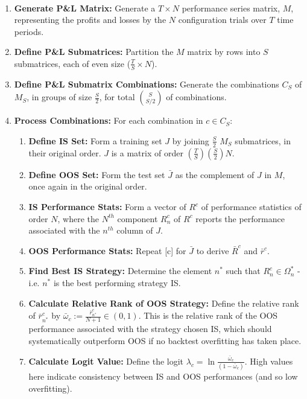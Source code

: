 \documentclass[a4paper,11pt,oneside]{article}
\theoremstyle{plain}
\theoremstyle{definition}
\begin{document}
	\begin{algorithm}[H]
		\texttt{\\}
		
		\begin{enumerate}
			\item \textbf{Generate P\&L Matrix:} Generate a $T\times N$ performance series matrix, $M$, representing the profits and losses by the $N$ configuration trials over $T$ time periods.
			\item \textbf{Define P\&L Submatrices:}  Partition the $M$ matrix by rows into $S$ submatrices, each of even size ($\frac{T}{S}\times N$).
			\item \textbf{Define P\&L Submatrix Combinations:} Generate the combinations $C_S$ of $M_S$, in groups of size $\frac{S}{2}$, for total $\binom{S}{S/2}$ of combinations.
			\item \textbf{Process Combinations:} For each combination in $c \in C_S$:
			\begin{enumerate}
				\item \textbf{Define IS Set:} Form a training set $J$ by joining $\frac{S}{2}$ $M_S$ submatrices, in their original order. $J$ is a matrix of order $\left(\frac{T}{S}\right)\left(\frac{S}{2}\right) N$.
				\item \textbf{Define OOS Set:}  Form the test set $\bar{J}$ as the complement of $J$ in $M$, once again in the original order.
				\item \textbf{IS Performance Stats:} Form a vector of $R^c$ of performance statistics of order $N$, where the $N^{th}$ component $R_n^c$ of $R^c$ reports the performance associated with the $n^{th}$ column of $J$.
				\item \textbf{OOS Performance Stats:}  Repeat [c] for $\bar{J}$ to derive $\bar{R}^c$ and $\bar{r}^c$.
				\item \textbf{Find Best IS Strategy:} Determine the element $n^*$ such that $R^c_n \in \Omega^*_n$ - i.e. $n^*$ is the best performing strategy IS.
				\item \textbf{Calculate Relative Rank of OOS Strategy:} Define the relative rank of $\bar{r}^c_{n^*}$ by $\bar{\omega}_c := \frac{\bar{r}^c_{n^*}}{N +1} \in (0,1)$. This is the relative rank of the OOS performance associated with the strategy chosen IS, which should systematically outperform OOS if no backtest overfitting has taken place.
				\item \textbf{Calculate Logit Value:} Define the logit $\lambda_c = \ln \frac{\bar{\omega}_c}{(1-\bar{\omega}_c)}$. High values here indicate consistency between IS and OOS performances (and so low overfitting).

\end{enumerate}
\end{enumerate}
\end{algorithm}
\end{document}
